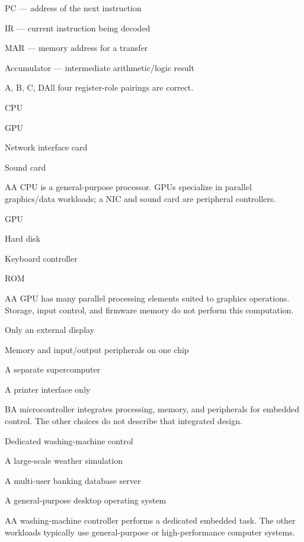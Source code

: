\begin{enumerate}[label=\textbf{Q\arabic*.}, leftmargin=*]
  {\item PC --- address of the next instruction
   \item IR --- current instruction being decoded
   \item MAR --- memory address for a transfer
   \item Accumulator --- intermediate arithmetic/logic result}
  {A, B, C, D}{All four register-role pairings are correct.}
\fi
\ifnum{}
  {\item CPU
   \item GPU
   \item Network interface card
   \item Sound card}
  {A}{A CPU is a general-purpose processor. GPUs specialize in parallel graphics/data workloads; a NIC and sound card are peripheral controllers.}
  {\item GPU
   \item Hard disk
   \item Keyboard controller
   \item ROM}
  {A}{A GPU has many parallel processing elements suited to graphics operations. Storage, input control, and firmware memory do not perform this computation.}
  {\item Only an external display
   \item Memory and input/output peripherals on one chip
   \item A separate supercomputer
   \item A printer interface only}
  {B}{A microcontroller integrates processing, memory, and peripherals for embedded control. The other choices do not describe that integrated design.}
  {\item Dedicated washing-machine control
   \item A large-scale weather simulation
   \item A multi-user banking database server
   \item A general-purpose desktop operating system}
  {A}{A washing-machine controller performs a dedicated embedded task. The other workloads typically use general-purpose or high-performance computer systems.}

\end{enumerate}
